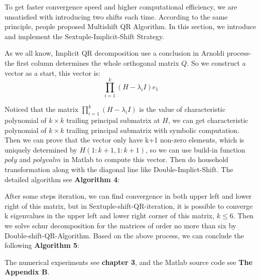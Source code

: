 To get faster convergence speed and higher computational efficiency, we are unsatisfied with introducing two shifts each time. According to the same principle, people proposed Multishift QR Algorithm. In this section, we introduce and implement the Sextuple-Implicit-Shift Strategy.

As we all know, Implicit QR decomposition use a conclusion in Arnoldi process-the first column determines the whole orthogonal matrix \(Q\). So we construct a vector as a start, this vector is:
\[\prod\limits_{i = 1}^k {(H - {\lambda _i}I){e_1}} \]

Noticed that the matrix \(\prod\limits_{i = 1}^k {(H - {\lambda _i}I)} \) is the value of characteristic polynomial of \(k\times k\) trailing principal submatrix at \(H\), we can get characteristic polynomial of \(k\times k\) trailing principal submatrix with symbolic computation. Then we can prove that the vector only have k+1 non-zero elements, which is uniquely determined by \(H(1:k+1,1:k+1)\), so we can use build-in function \(poly\) and \(polyvalm\) in Matlab to compute this vector. Then do household transformation along with the diagonal line like Double-Implict-Shift. The detailed algorithm see \textbf{Algorithm 4}:


After some steps iteration, we can find convergence in both upper left and lower right of this matrix, but in Sextuple-shift-QR-iteration, it is possible to converge k eigenvalues in the upper left and lower right corner of this matrix, \(k\le6\). Then we solve schur decomposition for the matrices of order no more than six by Double-shift-QR-Algorithm. Based on the above process, we can conclude the following \textbf{Algorithm 5}:

The numerical experiments see \textbf{chapter 3}, and the Matlab source code see \textbf{The Appendix B}.